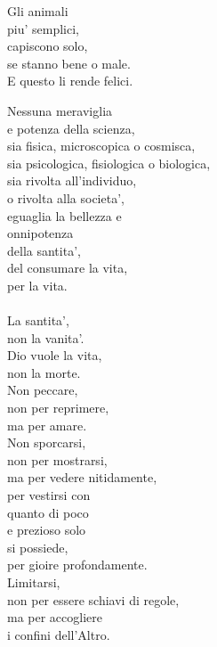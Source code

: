 \begin{haiku}
    Gli animali\\
    piu' semplici,\\
    capiscono solo,\\
    se stanno bene o male.\\
    E questo li rende felici.\\
\end{haiku}

\begin{haiku}
    Nessuna meraviglia\\
    e potenza della scienza,\\
    sia fisica, microscopica o cosmisca,\\
    sia psicologica, fisiologica o biologica,\\
    sia rivolta all'individuo, \\
    o rivolta alla societa',\\
    eguaglia la bellezza e\\
    onnipotenza\\
    della santita',\\
    del consumare la vita,\\
    per la vita.\\
    \leavevmode\\
    La santita',\\
    non la vanita'.\\
    Dio vuole la vita,\\
    non la morte.\\
    Non peccare,\\
    non per reprimere,\\
    ma per amare.\\
    Non sporcarsi,\\
    non per mostrarsi,\\
    ma per vedere nitidamente,\\
    per vestirsi con\\
    quanto di poco\\
    e prezioso solo\\
    si possiede,\\
    per gioire profondamente.\\
    Limitarsi, \\
    non per essere schiavi
    di regole,\\
    ma per accogliere \\
    i confini dell'Altro.\\
\end{haiku}


